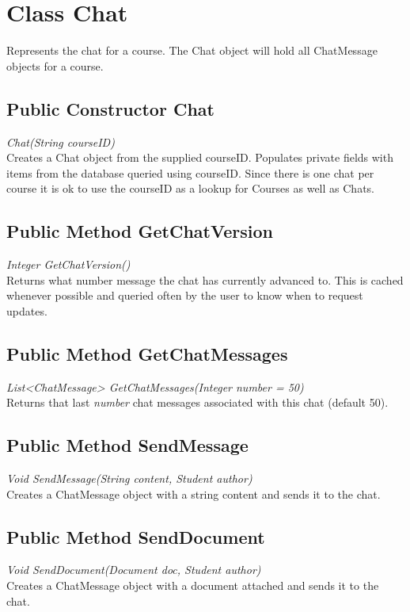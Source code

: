 \documentclass[16pt]{scrreprt}
\begin{document}
\section{Class Chat}
Represents the chat for a course. The Chat object will hold all ChatMessage objects for a course.

\subsection{Public Constructor Chat}
\textit{Chat(String courseID)} \\
Creates a Chat object from the supplied courseID. Populates private fields with items from the database queried using courseID. Since there is one chat per course it is ok to use the courseID as a lookup for Courses as well as Chats.

\subsection{Public Method GetChatVersion}
\textit{Integer GetChatVersion()} \\
Returns what number message the chat has currently advanced to. This is cached whenever possible and queried often by the user to know when to request updates.

\subsection{Public Method GetChatMessages}
\textit{List<ChatMessage> GetChatMessages(Integer number = 50)} \\
Returns that last \textit{number} chat messages associated with this chat (default 50).

\subsection{Public Method SendMessage}
\textit{Void SendMessage(String content, Student author)} \\
Creates a ChatMessage object with a string content and sends it to the chat.

\subsection{Public Method SendDocument}
\textit{Void SendDocument(Document doc, Student author)} \\
Creates a ChatMessage object with a document attached and sends it to the chat.
\end{document}
